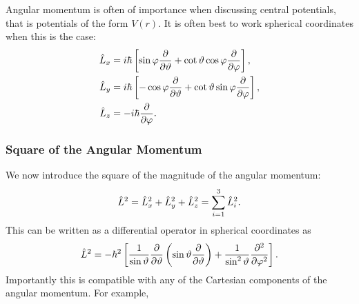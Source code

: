 \documentclass[a4paper]{article}
\theoremstyle{definition}
\begin{document}
    Angular momentum is often of importance when discussing central potentials, that is potentials of the form \(V(r)\).
    It is often best to work spherical coordinates when this is the case:
    \begin{align*}
        \hat{L}_x &= i\hbar\left[\sin\varphi \pdv{\vartheta} + \cot\vartheta \cos\varphi \pdv{\varphi}\right],\\
        \hat{L}_y &= i\hbar\left[-\cos\varphi \pdv{\vartheta} + \cot\vartheta \sin\varphi \pdv{\varphi}\right],\\
        \hat{L}_z &= -i\hbar\pdv{\varphi}.
    \end{align*}
    
    \subsubsection{Square of the Angular Momentum}
    We now introduce the square of the magnitude of the angular momentum:
    \[\hat{L}^2 = \hat{L}_x^2 + \hat{L}_y^2 + \hat{L}_z^2 = \sum_{i=1}^{3} \hat{L}_i^2.\]
    This can be written as a differential operator in spherical coordinates as
    \begin{equation}\label{eqn:L^2 in spherical coord}
        \hat{L}^2 = -\hbar^2 \left[\frac{1}{\sin\vartheta}\pdv{\vartheta}\left(\sin\vartheta \pdv{\vartheta}\right) + \frac{1}{\sin^2\vartheta}\pdv[2]{\varphi}\right].
    \end{equation}
    Importantly this is compatible with any of the Cartesian components of the angular momentum.
    For example,
\end{document}
